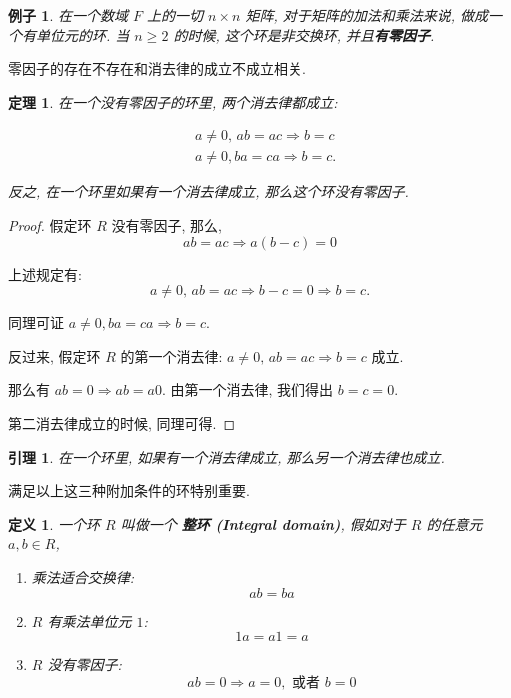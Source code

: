 \documentclass[utf8]{ctexbook}
\newtheorem{theorem}{定理}[section]
\newtheorem{definition}{定义}[section]
\newtheorem{example}{例子}[section]
\newtheorem{lemma}{引理}[section]
\begin{document}
\begin{example}
在一个数域 $F$ 上的一切 $n \times n $ 矩阵, 对于矩阵的加法和乘法来说, 做成一个有单位元的环. 当 $n \geq 2$ 的时候, 这个环是非交换环, 并且\textbf{有零因子}.
\end{example}

零因子的存在不存在和消去律的成立不成立相关.

\begin{theorem}
在一个没有零因子的环里, 两个消去律都成立:

\begin{align*}
& a \neq 0, \, ab = ac \Rightarrow b = c \\
& a \neq 0, ba = ca \Rightarrow b = c .
\end{align*}

反之, 在一个环里如果有一个消去律成立, 那么这个环没有零因子.
\end{theorem}

\begin{proof}
假定环 $R$ 没有零因子, 那么,
\begin{equation}
ab = ac \Rightarrow a(b- c) = 0
\end{equation}

上述规定有:
\begin{equation}
 a \neq 0, \, ab = ac \Rightarrow b-c = 0 \Rightarrow b = c .
\end{equation}

同理可证 $a \neq 0, ba = ca \Rightarrow b = c$.

反过来, 假定环 $R$ 的第一个消去律: $a \neq 0, \, ab = ac \Rightarrow b = c $ 成立.

那么有 $ab = 0 \Rightarrow ab = a0$. 由第一个消去律, 我们得出 $b = c = 0$.

第二消去律成立的时候, 同理可得.

\end{proof}

\begin{lemma}
在一个环里, 如果有一个消去律成立, 那么另一个消去律也成立.
\end{lemma}

满足以上这三种附加条件的环特别重要.


\begin{definition}
一个环 $R$ 叫做一个 \textbf{整环 (Integral domain)}, 假如对于 $R$ 的任意元 $a, b \in R$,
\begin{enumerate}
\item{乘法适合交换律:
\begin{equation}
a b = b a
\end{equation}
}
\item{$R$ 有乘法单位元 $1$:
\begin{equation}
1 a = a 1 = a
\end{equation}
}
\item{$R$ 没有零因子:
\begin{equation}
ab = 0 \Rightarrow a = 0, \mbox{  或者  } b = 0
\end{equation}
}
\end{enumerate}
\end{definition}
\end{document}
